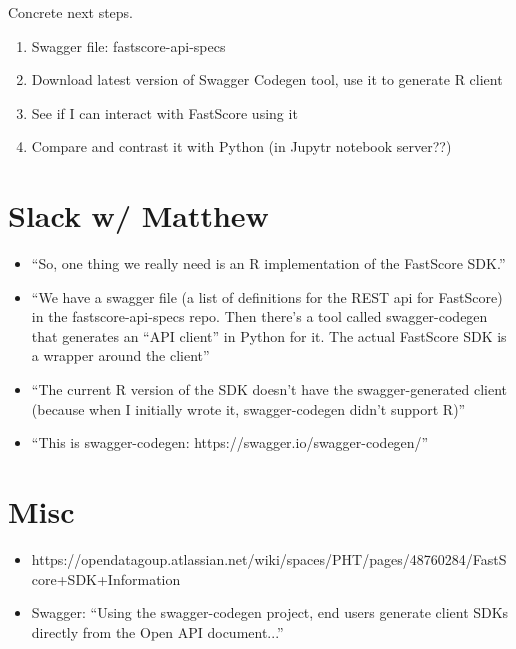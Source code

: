 \documentclass{article}
\begin{document}
Concrete next steps.
\begin{enumerate}
\item Swagger file: fastscore-api-specs
\item Download latest version of Swagger Codegen tool, use it to generate R client
\item See if I can interact with FastScore using it
\item Compare and contrast it with Python (in Jupytr notebook server??)
\end{enumerate}

\section*{Slack w/ Matthew}
\begin{itemize}
\item ``So, one thing we really need is an R implementation of the FastScore SDK.''
\item ``We have a swagger file (a list of definitions for the REST api for FastScore) in the fastscore-api-specs repo. Then there's a tool called swagger-codegen that generates an ``API client'' in Python for it. The actual FastScore SDK is a wrapper around the client''
\item ``The current R version of the SDK doesn't have the swagger-generated client (because when I initially wrote it, swagger-codegen didn't support R)''
\item ``This is swagger-codegen: https://swagger.io/swagger-codegen/''
\end{itemize}

\section*{Misc}
\begin{itemize}
\item https://opendatagoup.atlassian.net/wiki/spaces/PHT/pages/48760284/FastScore+SDK+Information
\item Swagger: ``Using the swagger-codegen project, end users generate client SDKs directly from the Open API document...''
\end{itemize}
\end{document}
